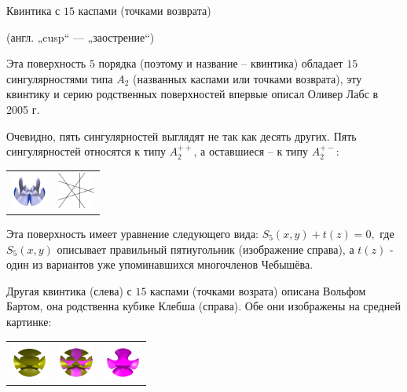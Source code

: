 \begin{surferPage}{Квинтика с $15$ каспами (точками возврата)\\{\normalfont\footnotesize(англ. „cusp“ — „заострение“)\par}}

Эта поверхность $5$ порядка (поэтому и название – квинтика) обладает $15$ сингулярностями типа $A_2$ (названных каспами или точками возврата), эту квинтику и серию родственных поверхностей впервые описал Оливер Лабс в 2005 г. 

Очевидно, пять сингулярностей выглядят не так как десять других. Пять сингулярностей относятся к типу $A_2^{++}$, а оставшиеся – к типу $A_2^{+-}$:
     \vspace*{-0.3em}
    \begin{center}
      \begin{tabular}{c@{\qquad}c}
        \includegraphics[height=1.2cm]{./../../common/images/dessins_quint_15a2}
        &
        \includegraphics[height=1.2cm]{./../../common/images/rp5.pdf}
      \end{tabular}
    \end{center}
    \vspace*{-0.3em}    
    
    Эта поверхность имеет уравнение следующего вида:
    $S_5(x,y) + t(z)=0,$
    где $S_5(x,y)$ описывает правильный пятиугольник (изображение справа), а $t(z)$ - один из вариантов уже упоминавшихся многочленов Чебышёва.

Другая квинтика (слева) с $15$ каспами (точками возрата) описана Вольфом Бартом, она родственна кубике Клебша (справа). Обе они изображены на средней картинке:

    \vspace*{-1em}
    \begin{center}
      \begin{tabular}{c@{\quad}c@{\quad}c}
        \includegraphics[height=1.2cm]{./../../common/images/barthquintic_green}
        &
        \includegraphics[height=1.2cm]{./../../common/images/barthquintic_clebschcubic}
        &
        \includegraphics[height=1.2cm]{./../../common/images/clebschcubic_pink}
      \end{tabular}
    \end{center}
\end{surferPage}
